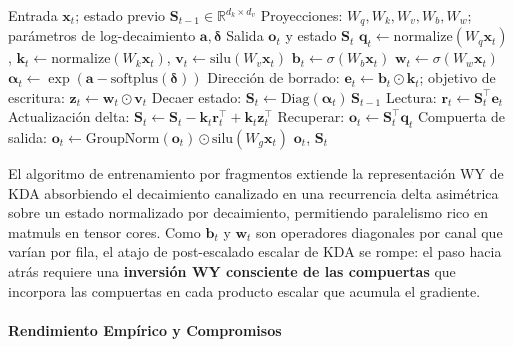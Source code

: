 \begin{algorithm}[H]
\caption{Avance Recurrente de Gated DeltaNet-2 (Forma de Referencia)}
\begin{algorithmic}[1]
\Require Entrada $\mathbf{x}_t$; estado previo $\mathbf{S}_{t-1} \in \mathbb{R}^{d_k \times d_v}$
\Require Proyecciones: $W_q, W_k, W_v, W_b, W_w$; parámetros de log-decaimiento $\mathbf{a}, \boldsymbol{\delta}$
\Ensure Salida $\mathbf{o}_t$ y estado $\mathbf{S}_t$
\State $\mathbf{q}_t \gets \mathrm{normalize}(W_q \mathbf{x}_t)$, $\mathbf{k}_t \gets \mathrm{normalize}(W_k \mathbf{x}_t)$, $\mathbf{v}_t \gets \mathrm{silu}(W_v \mathbf{x}_t)$
\State $\mathbf{b}_t \gets \sigma(W_b \mathbf{x}_t)$ 
\State $\mathbf{w}_t \gets \sigma(W_w \mathbf{x}_t)$ 
\State $\boldsymbol{\alpha}_t \gets \exp(\mathbf{a} - \mathrm{softplus}(\boldsymbol{\delta}))$ 
\State Dirección de borrado: $\mathbf{e}_t \gets \mathbf{b}_t \odot \mathbf{k}_t$; objetivo de escritura: $\mathbf{z}_t \gets \mathbf{w}_t \odot \mathbf{v}_t$
\State Decaer estado: $\mathbf{S}_t \gets \mathrm{Diag}(\boldsymbol{\alpha}_t)\, \mathbf{S}_{t-1}$
\State Lectura: $\mathbf{r}_t \gets \mathbf{S}_t^\top \mathbf{e}_t$ 
\State Actualización delta: $\mathbf{S}_t \gets \mathbf{S}_t - \mathbf{k}_t \mathbf{r}_t^\top + \mathbf{k}_t \mathbf{z}_t^\top$
\State Recuperar: $\mathbf{o}_t \gets \mathbf{S}_t^\top \mathbf{q}_t$
\State Compuerta de salida: $\mathbf{o}_t \gets \mathrm{GroupNorm}(\mathbf{o}_t) \odot \mathrm{silu}(W_g \mathbf{x}_t)$
\State \Return $\mathbf{o}_t$, $\mathbf{S}_t$
\end{algorithmic}
\end{algorithm}

El algoritmo de entrenamiento por fragmentos extiende la representación WY de KDA absorbiendo el decaimiento canalizado en una recurrencia delta asimétrica sobre un estado normalizado por decaimiento, permitiendo paralelismo rico en matmuls en tensor cores. Como $\mathbf{b}_t$ y $\mathbf{w}_t$ son operadores diagonales por canal que varían por fila, el atajo de post-escalado escalar de KDA se rompe: el paso hacia atrás requiere una \textbf{inversión WY consciente de las compuertas} que incorpora las compuertas en cada producto escalar que acumula el gradiente.

\paragraph{Rendimiento Empírico y Compromisos}

